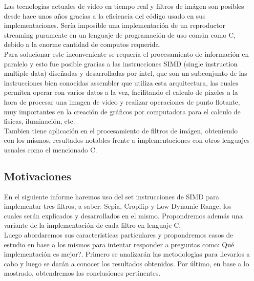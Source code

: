 Las tecnologias actuales de video en tiempo real y filtros de imágen son posibles desde hace unos años gracias a la eficiencia del código usado en sus implementaciones. Sería imposible una implementación de un reproductor streaming puramente en un lenguaje de programación de uso común como C, debido a la enorme cantidad de computos requerida.\\

Para solucionar este inconveniente se requería el procesamiento de información en paralelo y esto fue posible gracias a las instrucciones SIMD (single instruction multiple data) diseñadas y desarrolladas por intel, que son un subconjunto de las instrucciones bien conocidas assembler que utiliza esta arquitectura, las cuales permiten operar con varios datos a la vez, facilitando el calculo de pixeles a la hora de procesar una imagen de video y realizar operaciones de punto flotante, muy importantes en la creación de gráficos por computadora para el calculo de fisicas, iluminación, etc.\\
Tambien tiene aplicación en el procesamiento de filtros de imágen, obteniendo con los mismos, resultados notables frente a implementaciones con otros lenguajes usuales como el mencionado C.

\subsection{Motivaciones}

En el siguiente informe haremos uso del set instrucciones de SIMD para implementar tres filtros, a saber: Sepia, Cropflip y Low Dynamic Range, los cuales serán explicados y desarrollados en el mismo. Propondremos además una variante de la implementación de cada filtro en lenguaje C.\\

Luego abordaremos sus caracteristicas particulares y propondremos casos de estudio en base a los mismos para intentar responder a preguntas como: Qué implementación es mejor?. Primero se analizarán las metodologias para llevarlos a cabo y luego se darán a conocer los resultados obtenidos. Por último, en base a lo mostrado, obtendremos las conclusiones pertinentes.